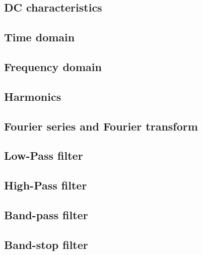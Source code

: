 \subsection{DC characteristics}
\subsection{Time domain}
\subsection{Frequency domain}
\subsection{Harmonics}
\subsection{Fourier series and Fourier transform}
\subsection{Low-Pass filter}
\subsection{High-Pass filter}
\subsection{Band-pass filter}
\subsection{Band-stop filter}